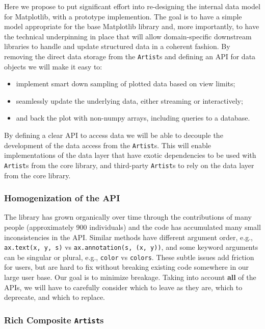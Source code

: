\documentclass[11pt]{article}  %
\begin{document}
Here we propose to put significant effort into re-designing the
internal data model for Matplotlib, with a prototype implemention. The
goal is to have a simple model appropriate for the base Matplotlib
library and, more importantly, to have the technical underpinning in
place that will allow domain-specific downstream libraries to
handle and update structured data in a coherent fashion.  By
removing the direct data storage from the \texttt{Artist}s and
defining an API for data objects we will make it easy to:
\begin{itemize}
  \item implement smart down sampling of plotted data based on view
    limits;
  \item seamlessly update the underlying data, either
    streaming or interactively;
  \item and back the plot with non-numpy arrays, including queries to a
    database.
\end{itemize}
By defining a clear API to access data we will be able to decouple
the development of the data access from the \texttt{Artist}s.  This
will enable implementations of the data layer that have exotic
dependencies to be used with \texttt{Artist}s from the core library, and
third-party \texttt{Artist}s to rely on the data layer from the core
library.

\subsubsection{Homogenization of the API}

The library has grown organically over time through the contributions
of many people (approximately 900 individuals) and the code has
accumulated many small inconsistencies in the API.  Similar methods
have different argument order, e.g., \texttt{ax.text(x, y, s)} vs
\texttt{ax.annotation(s, (x, y))}, and some keyword arguments can be
singular or plural, e.g., \texttt{color} vs \texttt{colors}.  These
subtle issues add friction for users, but are hard to fix without
breaking existing code somewhere in our large user base.
Our goal is to minimize breakage.  Taking into account
\textbf{all} of the APIs, we will have to carefully consider
which to leave as they are, which to deprecate, and which to
replace.


\subsubsection{Rich Composite \texttt{Artist}s}
\end{document}
